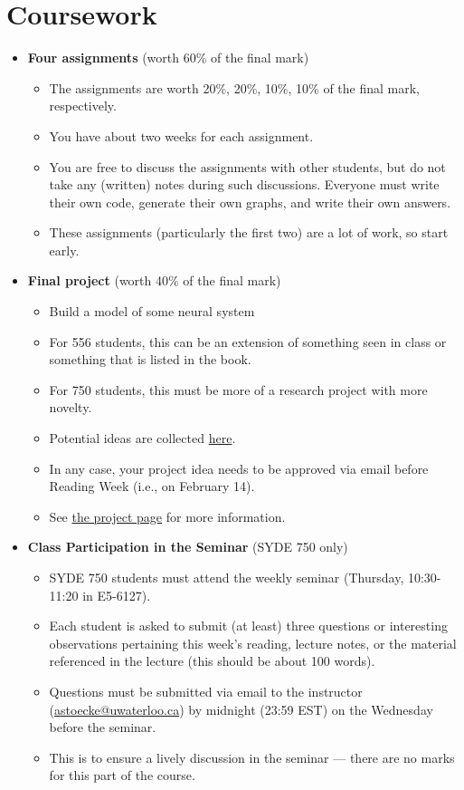 \documentclass[10pt,letterpaper,oneside]{article}
\begin{document}
\newpage

\section{Coursework}

\begin{itemize}
	\item \textbf{Four assignments} (worth 60\% of the final mark)
	\begin{itemize}
		\item The assignments are worth 20\%, 20\%, 10\%, 10\% of the final mark, respectively.
		\item You have about two weeks for each assignment.
		\item You are free to discuss the assignments with other students, but do not take any (written) notes during such discussions. Everyone must write their own code, generate their own graphs, and write their own answers.
		\item These assignments (particularly the first two) are a lot of work, so start early.
	\end{itemize}
	\item \textbf{Final project} (worth 40\% of the final mark)
	\begin{itemize}
		\item Build a model of some neural system
		\item For 556 students, this can be an extension of something seen in class or something that is listed in the book.
		\item For 750 students, this must be more of a research project with more novelty.
		\item Potential ideas are collected \href{http://compneuro.uwaterloo.ca/courses/syde-750/syde-556-possible-projects.html}{here}.
		\item In any case, your project idea needs to be approved via email before Reading Week (i.e., on February 14).
		\item See \href{http://compneuro.uwaterloo.ca/courses/syde-750/syde-556-possible-projects.html}{the project page} for more information.
	\end{itemize}
	\item \textbf{Class Participation in the Seminar}  (SYDE 750 only)
	\begin{itemize}
		\item SYDE 750 students must attend the weekly seminar (Thursday, 10:30-11:20 in E5-6127).
		\item Each student is asked to submit (at least) three questions or interesting observations pertaining this week's reading, lecture notes, or the material referenced in the lecture (this should be about 100 words).
		\item Questions must be submitted via email to the instructor (\url{astoecke@uwaterloo.ca}) by midnight (23:59 EST) on the Wednesday before the seminar.
		\item This is to ensure a lively discussion in the seminar --- there are no marks for this part of the course.
	\end{itemize}
\end{itemize}
\end{document}
